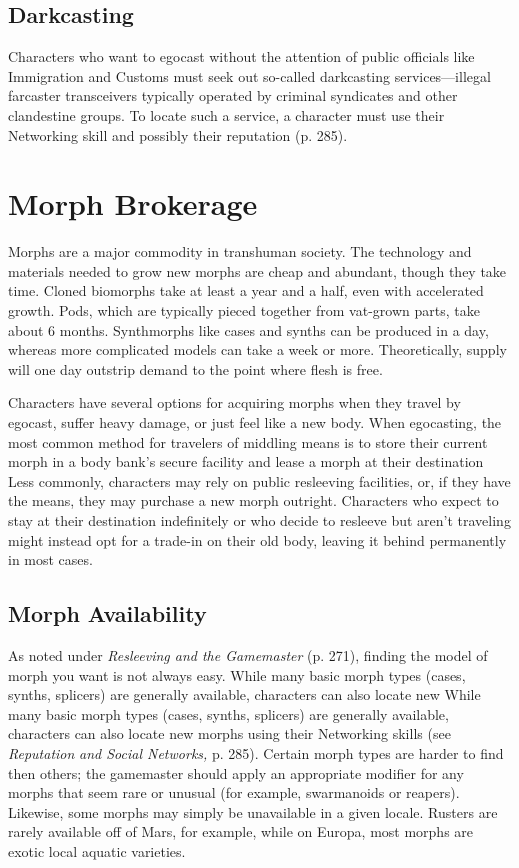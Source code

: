 \subsection{Darkcasting}

Characters who want to egocast without the attention
of public officials like Immigration and Customs
must seek out so-called darkcasting services—illegal 
farcaster transceivers typically operated by criminal 
syndicates and other clandestine groups. To locate 
such a service, a character must use their Networking 
skill and possibly their reputation (p. 285).

\section{Morph Brokerage}

Morphs are a major commodity in transhuman society. 
The technology and materials needed to grow new 
morphs are cheap and abundant, though they take 
time. Cloned biomorphs take at least a year and a half, 
even with accelerated growth. Pods, which are typically
pieced together from vat-grown parts, take about
6 months. Synthmorphs like cases and synths can be 
produced in a day, whereas more complicated models 
can take a week or more. Theoretically, supply will one 
day outstrip demand to the point where flesh is free.

Characters have several options for acquiring 
morphs when they travel by egocast, suffer heavy 
damage, or just feel like a new body. When egocasting, 
the most common method for travelers of middling 
means is to store their current morph in a body bank's 
secure facility and lease a morph at their destination
Less commonly, characters may rely on public
resleeving facilities, or, if they have the means, they 
may purchase a new morph outright. Characters who 
expect to stay at their destination indefinitely or who 
decide to resleeve but aren't traveling might instead 
opt for a trade-in on their old body, leaving it behind 
permanently in most cases.

\subsection{Morph Availability}

As noted under \textit{Resleeving and the Gamemaster} (p. 271), 
finding the model of morph you want is not always easy. 
While many basic morph types (cases, synths, splicers) 
are generally available, characters can also locate new 
While many basic morph types (cases, synths, splicers)
are generally available, characters can also locate new 
morphs using their Networking skills (see \textit{Reputation }
\textit{and Social Networks,} p. 285). Certain morph types 
are harder to find then others; the gamemaster should 
apply an appropriate modifier for any morphs that seem 
rare or unusual (for example, swarmanoids or reapers). 
Likewise, some morphs may simply be unavailable in a 
given locale. Rusters are rarely available off of Mars, for 
example, while on Europa, most morphs are exotic local 
aquatic varieties.

